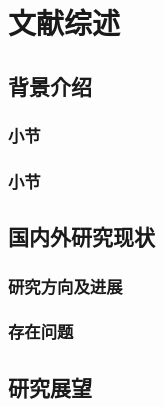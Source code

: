 \cleardoublepage
\chapter{文献综述}

\section{背景介绍}

\subsection{小节}

\subsection{小节}

\section{国内外研究现状}

\subsection{研究方向及进展}

\subsection{存在问题}

\section{研究展望}
